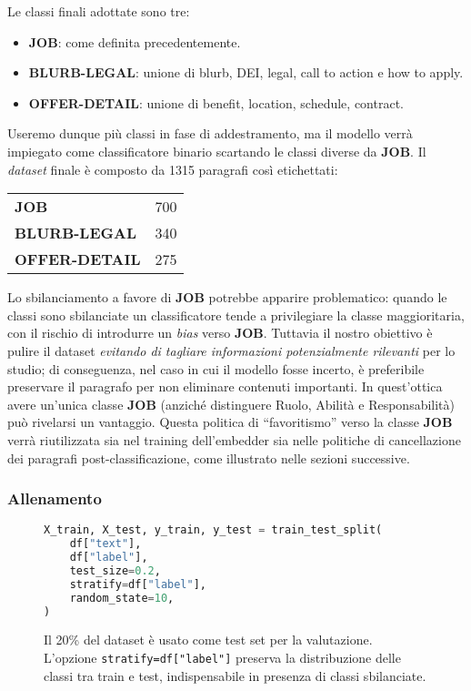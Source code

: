 \noindent Le classi finali adottate sono tre:

\begin{itemize}
    \item \textbf{JOB}: come definita precedentemente.
    \item \textbf{BLURB-LEGAL}: unione di blurb, DEI, legal, call to action e how to apply.
    \item \textbf{OFFER-DETAIL}: unione di benefit, location, schedule, contract.
\end{itemize}

\noindent Useremo dunque più classi in fase di addestramento, ma il modello verrà impiegato come classificatore binario scartando le classi diverse da \textbf{JOB}. Il \textit{dataset} finale è composto da 1315 paragrafi così etichettati:

\begin{center}
\begin{tabular}{ll}
\textbf{JOB} & 700 \\
\textbf{BLURB-LEGAL} & 340 \\
\textbf{OFFER-DETAIL} & 275 \\
\end{tabular}
\end{center}

\noindent Lo sbilanciamento a favore di \textbf{JOB} potrebbe apparire problematico: quando le classi sono sbilanciate un classificatore tende a privilegiare la classe maggioritaria, con il rischio di introdurre un \textit{bias} verso \textbf{JOB}. Tuttavia il nostro obiettivo è pulire il dataset \textit{evitando di tagliare informazioni potenzialmente rilevanti} per lo studio; di conseguenza, nel caso in cui il modello fosse incerto, è preferibile preservare il paragrafo per non eliminare contenuti importanti. In quest'ottica avere un'unica classe \textbf{JOB} (anziché distinguere Ruolo, Abilità e Responsabilità) può rivelarsi un vantaggio. Questa politica di ``favoritismo'' verso la classe \textbf{JOB} verrà riutilizzata sia nel training dell'embedder sia nelle politiche di cancellazione dei paragrafi post-classificazione, come illustrato nelle sezioni successive.
\subsubsection{Allenamento}

\begin{figure}[H]
    \centering
    \scriptsize
\begin{lstlisting}[language=python]
X_train, X_test, y_train, y_test = train_test_split(
    df["text"],
    df["label"],
    test_size=0.2,
    stratify=df["label"],
    random_state=10,
)
\end{lstlisting}
    \caption{Il 20\% del dataset è usato come test set per la valutazione. L'opzione \texttt{stratify=df["label"]} preserva la distribuzione delle classi tra train e test, indispensabile in presenza di classi sbilanciate.}
    \label{fig:clf-split}
\end{figure}

